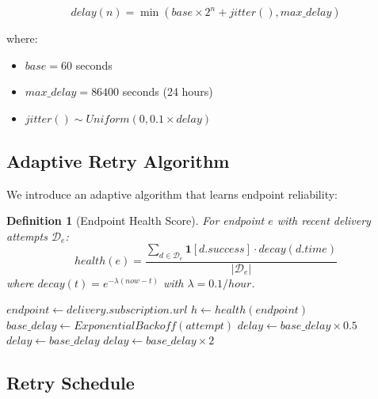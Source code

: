 \documentclass[11pt,a4paper]{article}
\newtheorem{definition}[theorem]{Definition}
\begin{document}
\begin{equation}
delay(n) = \min(base \times 2^n + jitter(), max\_delay)
\end{equation}

where:
\begin{itemize}
    \item $base = 60$ seconds
    \item $max\_delay = 86400$ seconds (24 hours)
    \item $jitter() \sim Uniform(0, 0.1 \times delay)$
\end{itemize}

\subsection{Adaptive Retry Algorithm}

We introduce an adaptive algorithm that learns endpoint reliability:

\begin{definition}[Endpoint Health Score]
For endpoint $e$ with recent delivery attempts $\mathcal{D}_e$:
\begin{equation}
health(e) = \frac{\sum_{d \in \mathcal{D}_e} \mathbf{1}[d.success] \cdot decay(d.time)}{|\mathcal{D}_e|}
\end{equation}
where $decay(t) = e^{-\lambda(now - t)}$ with $\lambda = 0.1/hour$.
\end{definition}

\begin{algorithm}
\caption{Adaptive Retry Scheduling}
\begin{algorithmic}[1]
    \State $endpoint \gets delivery.subscription.url$
    \State $h \gets health(endpoint)$
    \State $base\_delay \gets ExponentialBackoff(attempt)$
        \State {}
        \State $delay \gets base\_delay \times 0.5$
        \State {}
        \State $delay \gets base\_delay$
    \Else
        \State {}
        \State $delay \gets base\_delay \times 2$
    \EndIf
    \State {}
\EndFunction
\end{algorithmic}
\end{algorithm}

\subsection{Retry Schedule}
\end{document}
